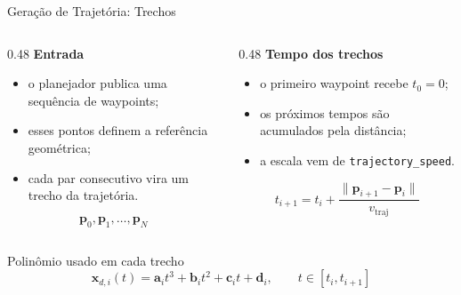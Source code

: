 \documentclass[aspectratio=169]{beamer}
\begin{document}
\begin{frame}{Geração de Trajetória: Trechos}
    \begin{columns}[T]
        \begin{column}{0.48\textwidth}
            \textbf{Entrada}
            \begin{itemize}
                \item o planejador publica uma sequência de waypoints;
                \item esses pontos definem a referência geométrica;
                \item cada par consecutivo vira um trecho da trajetória.
            \end{itemize}

            \[
                \mathbf{p}_0,\mathbf{p}_1,\ldots,\mathbf{p}_N
            \]
        \end{column}
        \begin{column}{0.48\textwidth}
            \textbf{Tempo dos trechos}
            \begin{itemize}
                \item o primeiro waypoint recebe $t_0=0$;
                \item os próximos tempos são acumulados pela distância;
                \item a escala vem de \texttt{trajectory\_speed}.
            \end{itemize}

            \[
                t_{i+1}=t_i+
                \frac{\|\mathbf{p}_{i+1}-\mathbf{p}_i\|}
                {v_{\mathrm{traj}}}
            \]
        \end{column}
    \end{columns}

    \vspace{0.2cm}
    \begin{block}{Polinômio usado em cada trecho}
        \[
            \mathbf{x}_{d,i}(t)=
            \mathbf{a}_i t^3+
            \mathbf{b}_i t^2+
            \mathbf{c}_i t+
            \mathbf{d}_i,
            \qquad
            t \in [t_i,t_{i+1}]
        \]
    \end{block}
\end{frame}
\end{document}
